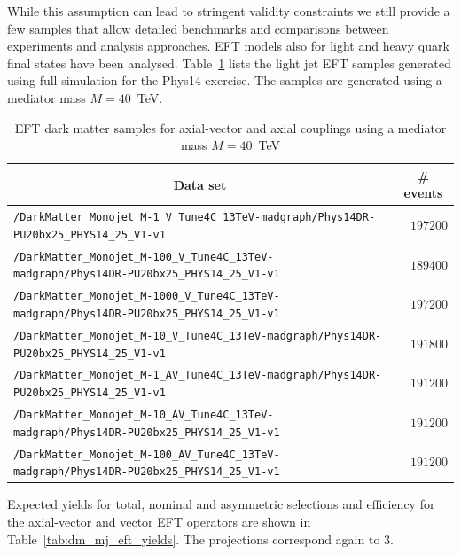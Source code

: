 While this assumption can lead to stringent validity constraints we still provide a few samples that allow detailed benchmarks and comparisons between experiments and analysis approaches.
EFT models also for light and heavy quark final states have been analysed.
Table~\ref{tab:datasets_dm} lists the light jet EFT samples generated using full simulation for the Phys14 exercise. The samples are generated using a mediator mass $M=40$~TeV.

\begin{table}[h!]
  \small
    \centering
    \begin{tabular}{lr}
      \hline\hline
      \multicolumn{1}{c}{Data set}&\multicolumn{1}{c}{\# events}\tabularnewline
      \hline
      {\footnotesize \verb!/DarkMatter_Monojet_M-1_V_Tune4C_13TeV-madgraph/Phys14DR-PU20bx25_PHYS14_25_V1-v1!   } &$197200$\tabularnewline
      {\footnotesize \verb!/DarkMatter_Monojet_M-100_V_Tune4C_13TeV-madgraph/Phys14DR-PU20bx25_PHYS14_25_V1-v1! } &$189400$\tabularnewline
      {\footnotesize \verb!/DarkMatter_Monojet_M-1000_V_Tune4C_13TeV-madgraph/Phys14DR-PU20bx25_PHYS14_25_V1-v1!} &$197200$\tabularnewline
      {\footnotesize \verb!/DarkMatter_Monojet_M-10_V_Tune4C_13TeV-madgraph/Phys14DR-PU20bx25_PHYS14_25_V1-v1!  } &$191800$\tabularnewline
      {\footnotesize \verb!/DarkMatter_Monojet_M-1_AV_Tune4C_13TeV-madgraph/Phys14DR-PU20bx25_PHYS14_25_V1-v1!  } &$191200$\tabularnewline
      {\footnotesize \verb!/DarkMatter_Monojet_M-10_AV_Tune4C_13TeV-madgraph/Phys14DR-PU20bx25_PHYS14_25_V1-v1! } &$191200$\tabularnewline
      {\footnotesize \verb!/DarkMatter_Monojet_M-100_AV_Tune4C_13TeV-madgraph/Phys14DR-PU20bx25_PHYS14_25_V1-v1!} &$191200$\tabularnewline
\hline
\end{tabular}
    \caption{EFT dark matter samples for axial-vector and axial couplings using a mediator mass $M=40$~TeV \label{tab:datasets_dm}}
\end{table}


Expected yields for total, nominal and asymmetric selections and efficiency for the axial-vector and vector EFT operators are shown in Table~\ref{tab:dm_mj_eft_yields}.
The projections correspond again to 3\fbinv.

